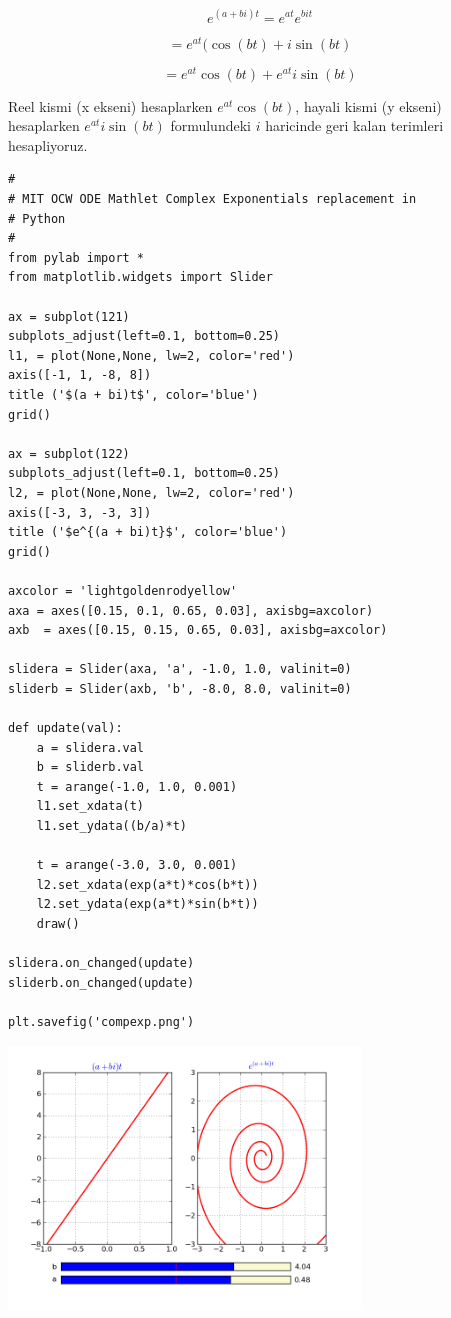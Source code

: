 \documentclass[12pt,fleqn]{article}\usepackage{../common}
\begin{document}
\[ e^{(a+bi)t} = e^{at} e^{bit}\]

\[ = e^{at} (\cos(bt) + i\sin(bt) \]

\[ = e^{at}\cos(bt) + e^{at} i\sin(bt) \]

Reel kismi (x ekseni) hesaplarken $e^{at}\cos(bt)$, hayali kismi (y ekseni)
hesaplarken $e^{at} i\sin(bt)$ formulundeki $i$ haricinde geri kalan terimleri
hesapliyoruz.

\begin{verbatim}
#
# MIT OCW ODE Mathlet Complex Exponentials replacement in 
# Python
#
from pylab import *
from matplotlib.widgets import Slider

ax = subplot(121)
subplots_adjust(left=0.1, bottom=0.25)
l1, = plot(None,None, lw=2, color='red')
axis([-1, 1, -8, 8])
title ('$(a + bi)t$', color='blue')
grid()

ax = subplot(122)
subplots_adjust(left=0.1, bottom=0.25)
l2, = plot(None,None, lw=2, color='red')
axis([-3, 3, -3, 3])
title ('$e^{(a + bi)t}$', color='blue')
grid()

axcolor = 'lightgoldenrodyellow'
axa = axes([0.15, 0.1, 0.65, 0.03], axisbg=axcolor)
axb  = axes([0.15, 0.15, 0.65, 0.03], axisbg=axcolor)

slidera = Slider(axa, 'a', -1.0, 1.0, valinit=0)
sliderb = Slider(axb, 'b', -8.0, 8.0, valinit=0)

def update(val):
    a = slidera.val
    b = sliderb.val
    t = arange(-1.0, 1.0, 0.001)
    l1.set_xdata(t)
    l1.set_ydata((b/a)*t)

    t = arange(-3.0, 3.0, 0.001)
    l2.set_xdata(exp(a*t)*cos(b*t))
    l2.set_ydata(exp(a*t)*sin(b*t))
    draw()
    
slidera.on_changed(update)
sliderb.on_changed(update)

plt.savefig('compexp.png')
\end{verbatim}

\includegraphics[height=7cm]{compexp.png}
\end{document}
